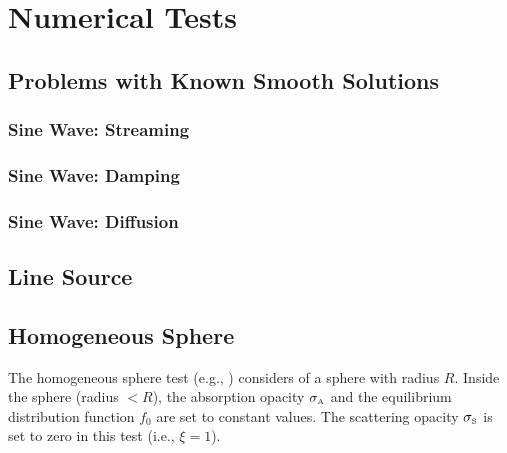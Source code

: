 \section{Numerical Tests}
\label{sec:numerical}

\subsection{Problems with Known Smooth Solutions}

\subsubsection{Sine Wave: Streaming}

\subsubsection{Sine Wave: Damping}

\subsubsection{Sine Wave: Diffusion}

\subsection{Line Source}

\subsection{Homogeneous Sphere}

The homogeneous sphere test (e.g., \cite{smit_etal_1997}) considers of a sphere with radius $R$.  
Inside the sphere (radius $<R$), the absorption opacity $\sigma_{\mbox{\tiny A}}$ and the equilibrium distribution function $f_{0}$ are set to constant values.  
The scattering opacity $\sigma_{\mbox{\tiny S}}$ is set to zero in this test (i.e., $\xi=1$).  

